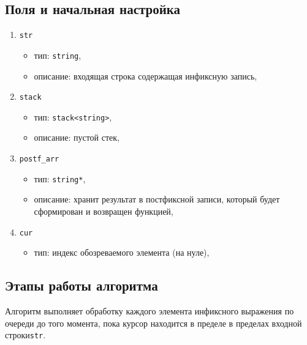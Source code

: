 \subsection*{Поля и начальная настройка}
\begin{enumerate}
	\item \texttt{str}
	\begin{itemize}
		\item тип: \texttt{string},
		\item описание: входящая строка содержащая инфиксную запись,
	\end{itemize}
	
	\item \texttt{stack}
	\begin{itemize}
		\item тип: \texttt{stack<string>},
		\item описание: пустой стек,
	\end{itemize}
	
	\item \texttt{postf\_arr}
	\begin{itemize}
		\item тип: \texttt{string*},
		\item описание: хранит результат в постфиксной записи, который будет сформирован и возвращен функцией,
	\end{itemize}
	
	\item \texttt{cur}
	\begin{itemize}
		\item тип: индекс обозреваемого элемента (на нуле),
	\end{itemize}
\end{enumerate}

\subsection*{Этапы работы алгоритма}
Алгоритм выполняет обработку каждого элемента инфиксного выражения по очереди до того момента, пока курсор находится в пределе в пределах входной строки\texttt{str}.

